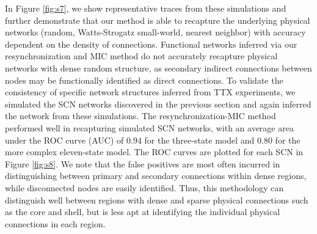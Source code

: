 In Figure \ref{fig:s7}, we show representative traces from these simulations and further demonstrate that our method is able to recapture the underlying physical networks (random, Watts-Strogatz small-world, nearest neighbor) with accuracy dependent on the density of connections.
Functional networks inferred via our resynchronization and MIC method do not accurately recapture physical networks with dense random structure, as secondary indirect connections between nodes may be functionally identified as direct connections.
To validate the consistency of specific network structures inferred from TTX experiments, we simulated the SCN networks discovered in the previous section and again inferred the network from these simulations.
The resynchronization-MIC method performed well in recapturing simulated SCN networks, with an average area under the ROC curve (AUC) of $0.94$ for the three-state model and $0.80$ for the more complex eleven-state model.
The ROC curves are plotted for each SCN in Figure \ref{fig:s8}.
We note that the false positives are most often incurred in distinguishing between primary and secondary connections within dense regions, while disconnected nodes are easily identified.
Thus, this methodology can distinguish well between regions with dense and sparse physical connections such as the core and shell, but is less apt at identifying the individual physical connections in each region.
